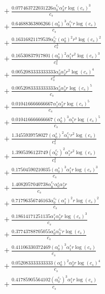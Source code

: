 \documentclass[10pt]{article}
\begin{document}
\begin{align*}
&{}  + \frac{0.077463722031226 \alpha_{0}^{c_s} \alpha_{3}^s r \log{\left(c_{s} \right)}^{3}}{c_{s}} \\
&{}  + \frac{0.64688363806266 \left(\alpha_{0}^s\right)^{3} \alpha_{1}^{c_s} r \log{\left(c_{s} \right)}}{c_{s}} \\
&{}  + \frac{0.16316821179539 \alpha_{0}^{c_s} \left(\alpha_{0}^s\right)^{2} r^{3} \log{\left(c_{s} \right)}^{2}}{c_{s}^{3}} \\
&{}  + \frac{0.16530837917801 \left(\alpha_{0}^s\right)^{2} \alpha_{1}^s r^{2} \log{\left(c_{s} \right)}^{3}}{c_{s}^{2}} \\
&{}  + \frac{0.0052083333333333 \alpha_{0}^s \alpha_{2}^s r^{2} \log{\left(c_{s} \right)}^{4}}{c_{s}^{2}} \\
&{}  + \frac{0.0052083333333333 \alpha_{0}^s \alpha_{3}^s r \log{\left(c_{s} \right)}^{5}}{c_{s}} \\
&{}  + \frac{0.010416666666667 \alpha_{1}^s \alpha_{2}^s r \log{\left(c_{s} \right)}^{5}}{c_{s}} \\
&{}  + \frac{0.010416666666667 \left(\alpha_{0}^s\right)^{3} \alpha_{1}^s r \log{\left(c_{s} \right)}^{5}}{c_{s}} \\
&{}  + \frac{1.3455939758027 \left(\alpha_{0}^s\right)^{2} \alpha_{1}^{c_s} r^{2} \log{\left(c_{s} \right)}}{c_{s}^{2}} \\
&{}  + \frac{1.3905396123749 \left(\alpha_{0}^{c_s}\right)^{2} \alpha_{1}^s r^{2} \log{\left(c_{s} \right)}}{c_{s}^{2}} \\
&{}  + \frac{0.17504590210035 \left(\alpha_{0}^s\right)^{3} \alpha_{1}^s r \log{\left(c_{s} \right)}^{3}}{c_{s}} \\
&{}  + \frac{1.4082057040738 \alpha_{0}^{c_s} \alpha_{0}^s \alpha_{2}^s r}{c_{s}} \\
&{}  + \frac{0.71796356746163 \alpha_{0}^{c_s} \left(\alpha_{1}^s\right)^{2} r \log{\left(c_{s} \right)}^{2}}{c_{s}} \\
&{}  + \frac{0.18614171251135 \alpha_{1}^s \alpha_{2}^s r \log{\left(c_{s} \right)}^{3}}{c_{s}} \\
&{}  + \frac{0.37743788705055 \alpha_{0}^s \alpha_{3}^{c_s} r \log{\left(c_{s} \right)}}{c_{s}} \\
&{}  + \frac{0.41106330372469 \left(\alpha_{0}^s\right)^{3} \alpha_{1}^s r \log{\left(c_{s} \right)}}{c_{s}} \\
&{}  + \frac{0.052083333333333 \left(\alpha_{0}^s\right)^{2} \alpha_{2}^s r \log{\left(c_{s} \right)}^{4}}{c_{s}} \\
&{}  + \frac{0.41785905564102 \left(\alpha_{0}^{c_s}\right)^{3} \alpha_{1}^s r \log{\left(c_{s} \right)}}{c_{s}} \\

\end{align*}
\end{document}
